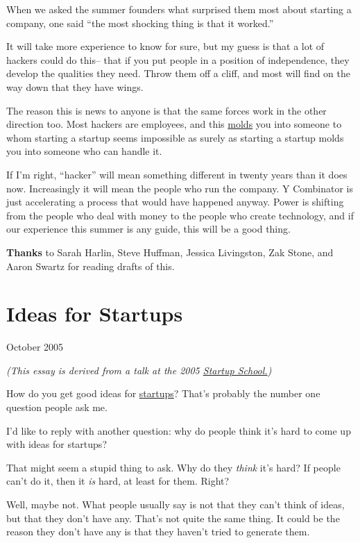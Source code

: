 \documentclass[12pt]{book}
\begin{document}
When we asked the summer founders what surprised them most about
starting a company, one said ``the most shocking thing is that it
worked.''

It will take more experience to know for sure, but my guess is that a
lot of hackers could do this-- that if you put people in a position of
independence, they develop the qualities they need. Throw them off a
cliff, and most will find on the way down that they have wings.

The reason this is news to anyone is that the same forces work in the
other direction too. Most hackers are employees, and this
\href{http://software.ericsink.com/entries/No_Great_Hackers.html}{molds}
you into someone to whom starting a startup seems impossible as surely
as starting a startup molds you into someone who can handle it.

If I'm right, ``hacker'' will mean something different in twenty years
than it does now. Increasingly it will mean the people who run the
company. Y Combinator is just accelerating a process that would have
happened anyway. Power is shifting from the people who deal with money
to the people who create technology, and if our experience this summer
is any guide, this will be a good thing.


\textbf{Thanks} to Sarah Harlin, Steve Huffman, Jessica Livingston, Zak
Stone, and Aaron Swartz for reading drafts of this.
\chapter{Ideas for Startups}

October 2005

\emph{(This essay is derived from a talk at the 2005
\href{http://startupschool.org}{Startup School.})}

How do you get good ideas for \href{start.html}{startups}? That's
probably the number one question people ask me.

I'd like to reply with another question: why do people think it's hard
to come up with ideas for startups?

That might seem a stupid thing to ask. Why do they \emph{think} it's
hard? If people can't do it, then it \emph{is} hard, at least for them.
Right?

Well, maybe not. What people usually say is not that they can't think of
ideas, but that they don't have any. That's not quite the same thing. It
could be the reason they don't have any is that they haven't tried to
generate them.
\end{document}
